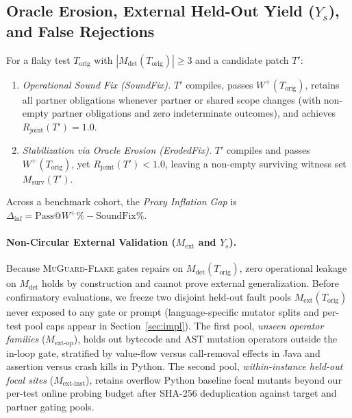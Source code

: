 \subsection{Oracle Erosion, External Held-Out Yield (\texorpdfstring{$Y_s$}{Ys}), and False Rejections}

\begin{definition}
\label{def:erosion}
For a flaky test $T_{\text{orig}}$ with $|M_{\text{det}}(T_{\text{orig}})| \ge 3$ and a candidate patch $T'$:
\begin{enumerate}[nosep]
    \item \emph{Operational Sound Fix (SoundFix).} $T'$ compiles, passes $W^+(T_{\text{orig}})$, retains all partner obligations whenever partner or shared scope changes (with non-empty partner obligations and zero indeterminate outcomes), and achieves $R_{\text{joint}}(T') = 1.0$.
    \item \emph{Stabilization via Oracle Erosion (ErodedFix).} $T'$ compiles and passes $W^+(T_{\text{orig}})$, yet $R_{\text{joint}}(T') < 1.0$, leaving a non-empty surviving witness set $M_{\text{surv}}(T')$.
\end{enumerate}
Across a benchmark cohort, the \emph{Proxy Inflation Gap} is $\Delta_{\text{inf}} = \text{Pass@}W^+\% - \text{SoundFix\%}$.
\end{definition}

\paragraph{Non-Circular External Validation ($M_{\text{ext}}$ and $Y_s$).}
Because \textsc{MuGuard-Flake} gates repairs on $M_{\text{det}}(T_{\text{orig}})$, zero operational leakage on $M_{\text{det}}$ holds by construction and cannot prove external generalization. Before confirmatory evaluations, we freeze two disjoint held-out fault pools $M_{\text{ext}}(T_{\text{orig}})$ never exposed to any gate or prompt (language-specific mutator splits and per-test pool caps appear in Section~\ref{sec:impl}). The first pool, \emph{unseen operator families} ($M_{\text{ext-op}}$), holds out bytecode and AST mutation operators outside the in-loop gate, stratified by value-flow versus call-removal effects in Java and assertion versus crash kills in Python. The second pool, \emph{within-instance held-out focal sites} ($M_{\text{ext-inst}}$), retains overflow Python baseline focal mutants beyond our per-test online probing budget after SHA-256 deduplication against target and partner gating pools.

